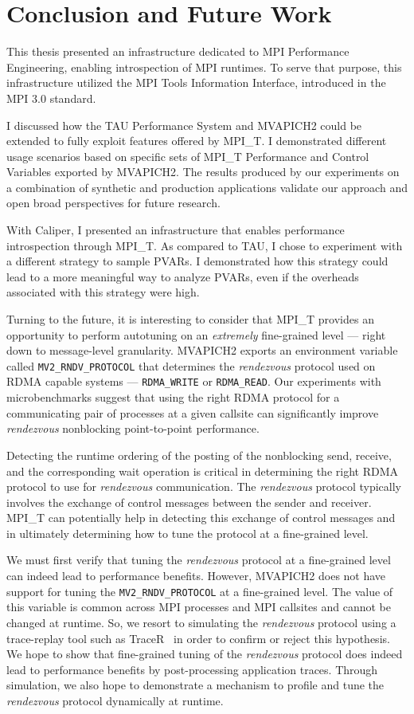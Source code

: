 \chapter{Conclusion and Future Work}
This thesis presented an infrastructure dedicated to MPI Performance Engineering, enabling introspection of MPI runtimes.
To serve that purpose, this infrastructure utilized the MPI Tools Information Interface, introduced in the MPI 3.0 standard.
\par I discussed how the TAU Performance System and MVAPICH2 could be extended to fully exploit features offered by MPI\_T. I demonstrated different usage scenarios based on specific sets of MPI\_T Performance and Control Variables exported by MVAPICH2. The results produced by our experiments on a combination of synthetic and production applications validate our approach and open broad perspectives for future research.
\par With Caliper, I presented an infrastructure that enables performance introspection through MPI\_T. As compared to TAU, I chose to experiment with a different strategy to sample PVARs. I demonstrated how this strategy could lead to a more meaningful way to analyze PVARs, even if the overheads associated with this strategy were high.
\par Turning to the future, it is interesting to consider that MPI\_T provides an opportunity to perform autotuning on an \textit{extremely} fine-grained level --- right down to message-level granularity. MVAPICH2 exports an environment variable called \verb+MV2_RNDV_PROTOCOL+ that determines the \textit{rendezvous} protocol used on RDMA capable systems --- \verb+RDMA_WRITE+ or \verb+RDMA_READ+. Our experiments with microbenchmarks suggest that using the right RDMA protocol for a communicating pair of processes at a given callsite can significantly improve \textit{rendezvous} nonblocking point-to-point performance. 
\par Detecting the runtime ordering of the posting of the nonblocking send, receive, and the corresponding wait operation is critical in determining the right RDMA protocol to use for \textit{rendezvous} communication. The \textit{rendezvous} protocol typically involves the exchange of control messages between the sender and receiver. MPI\_T can potentially help in detecting this exchange of control messages and in ultimately determining how to tune the protocol at a fine-grained level. 
\par We must first verify that tuning the \textit{rendezvous} protocol at a fine-grained level can indeed lead to performance benefits. However, MVAPICH2 does not have support for tuning the \verb+MV2_RNDV_PROTOCOL+ at a fine-grained level. The value of this variable is common across MPI processes and MPI callsites and cannot be changed at runtime. So, we resort to simulating the \textit{rendezvous} protocol using a trace-replay tool such as TraceR~\cite{TraceR} in order to confirm or reject this hypothesis. We hope to show that fine-grained tuning of the \textit{rendezvous} protocol does indeed lead to performance benefits by post-processing application traces. Through simulation, we also hope to demonstrate a mechanism to profile and tune the \textit{rendezvous} protocol dynamically at runtime.
